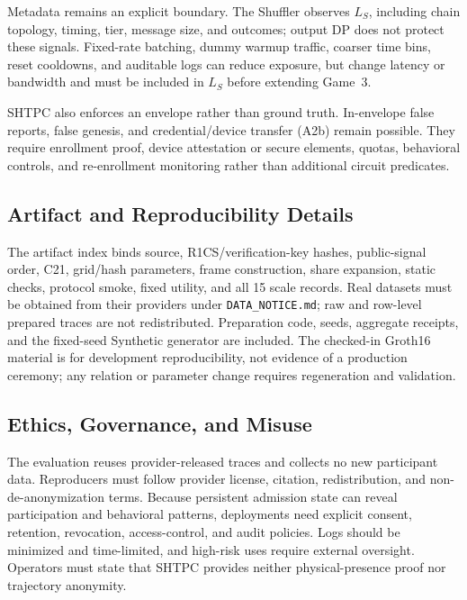 \documentclass[journal]{IEEEtran}
\theoremstyle{definition}
\theoremstyle{plain}
\begin{document}
Metadata remains an explicit boundary. The Shuffler observes \(L_S\), including
chain topology, timing, tier, message size, and outcomes; output DP does not
protect these signals. Fixed-rate batching, dummy warmup traffic, coarser time
bins, reset cooldowns, and auditable logs can reduce exposure, but change
latency or bandwidth and must be included in \(L_S\) before extending Game~3.

SHTPC also enforces an envelope rather than ground truth. In-envelope false
reports, false genesis, and credential/device transfer (A2b) remain possible.
\label{sec:a2b} They require enrollment proof, device attestation or secure
elements, quotas, behavioral controls, and re-enrollment monitoring rather than
additional circuit predicates.

\subsection{Artifact and Reproducibility Details}
\label{sec:artifact}

The artifact index binds source, R1CS/verification-key hashes, public-signal
order, C21, grid/hash parameters, frame construction, share expansion, static
checks, protocol smoke, fixed utility, and all 15 scale records. Real datasets
must be obtained from their providers under \texttt{DATA\_NOTICE.md}; raw and
row-level prepared traces are not redistributed. Preparation code, seeds,
aggregate receipts, and the fixed-seed Synthetic generator are included. The
checked-in Groth16 material is for development reproducibility, not evidence of
a production ceremony; any relation or parameter change requires regeneration
and validation.

\subsection{Ethics, Governance, and Misuse}
\label{sec:ethics}

The evaluation reuses provider-released traces and collects no new participant
data. Reproducers must follow provider license, citation, redistribution, and
non-de-anonymization terms. Because persistent admission state can reveal
participation and behavioral patterns, deployments need explicit consent,
retention, revocation, access-control, and audit policies. Logs should be
minimized and time-limited, and high-risk uses require external oversight.
Operators must state that SHTPC provides neither physical-presence proof nor
trajectory anonymity.
\end{document}
